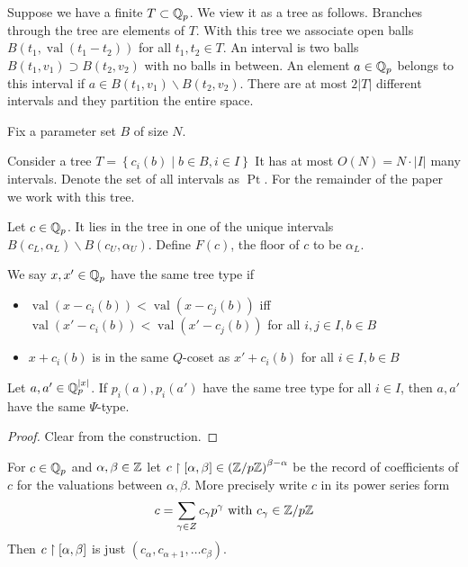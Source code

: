 \documentclass{amsart}
\newcommand{\curly}[1]{\left\{#1\right\}}
\newcommand{\paren}[1]{\left(#1\right)}
\DeclareMathOperator{\Pt}{Pt}
\DeclareMathOperator{\val}{val}
\begin{document}
\begin{Definition}
	Suppose we have a finite $T \subset \mathbb{Q}_p$.
	We view it as a tree as follows.
	Branches through the tree are elements of $T$.
	With this tree we associate open balls $B(t_1, \val(t_1 - t_2))$ for all $t_1, t_2 \in T$.
	An interval is two balls $B(t_1, v_1) \supset B(t_2, v_2)$ with no balls in between.
	An element $a \in \mathbb{Q}_p$ belongs to this interval if $a \in B(t_1, v_1) \backslash B(t_2, v_2)$.
	There are at most $2|T|$ different intervals and they partition the entire space.
	
	Fix a parameter set $B$ of size $N$.
	
	Consider a tree $T = \curly{c_i(b) \mid b \in B, i \in I}$
	It has at most $O(N) = N \cdot |I|$ many intervals.
	Denote the set of all intervals as $\Pt$.
	For the remainder of the paper we work with this tree.	
\end{Definition}

\begin{Definition}
	Let $c \in \mathbb{Q}_p$.
	It lies in the tree in one of the unique intervals $B(c_L, \alpha_L) \backslash B(c_U, \alpha_U)$.
	Define $F(c)$, the floor of $c$ to be $\alpha_L$.
\end{Definition}

\begin{Definition}
	We say $x, x' \in \mathbb{Q}_p$ have the same tree type if
	\begin{itemize}
		\item $\val(x - c_i(b)) < \val(x - c_j(b))$ iff $\val(x' - c_i(b)) < \val(x' - c_j(b))$ for all $i,j \in I, b \in B$
		\item $x + c_i(b)$ is in the same $Q$-coset as $x' + c_i(b)$ for all $i \in I, b \in B$
	\end{itemize}
\end{Definition}
 
\begin{Lemma} \label{sigh}
	Let $a, a' \in \mathbb{Q}_p^{|x|}$.
	If $p_i(a), p_i(a')$ have the same tree type for all $i \in I$, then $a, a'$ have the same $\Psi$-type.
\end{Lemma}
\begin{proof}
	Clear from the construction.
\end{proof}

\begin{Definition}
	For $c \in \mathbb{Q}_p$ and $\alpha, \beta \in \mathbb{Z}$ let $c \midr [\alpha, \beta] \in \paren{\Z/p\Z}^{\beta - \alpha}$ be the record of coefficients of $c$ for the valuations between $\alpha, \beta$.
	More precisely write $c$ in its power series form
	\begin{align*}
		c = \sum_{\gamma \in Z} c_\gamma p^\gamma \text{ with } c_\gamma \in \mathbb{Z}/p\mathbb{Z}
	\end{align*}
	Then $c \upharpoonright [\alpha, \beta]$ is just $(c_\alpha, c_{\alpha+1}, \ldots c_\beta)$.
\end{Definition}
\end{document}
